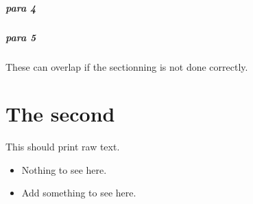 \paragraph{para 4}
\label{autosec:11}
\paragraph{para 5}
\label{autosec:12}
These can overlap if the sectionning is not done correctly.
\chapter{The second}
\label{autosec:13}
This should print raw text.
    \begin{itemize}[noitemsep]
        \item Nothing to see here.
        \item {\color{red}Add something to see here.}
    \end{itemize}

